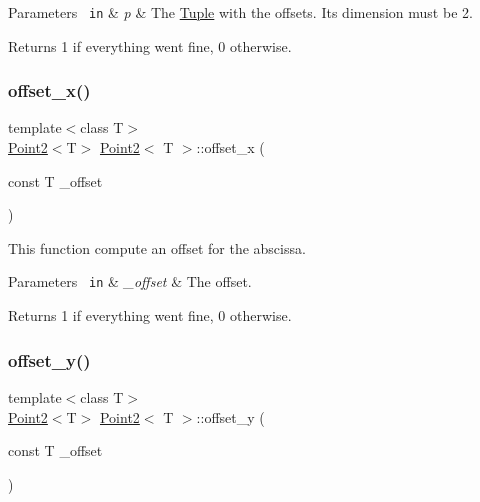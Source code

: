\begin{DoxyParams}[1]{Parameters}
\mbox{\texttt{ in}}  & {\em p} & The {\ttfamily \mbox{\hyperlink{class_tuple}{Tuple}}} with the offsets. Its dimension must be 2. \\
\hline
\end{DoxyParams}
\begin{DoxyReturn}{Returns}
1 if everything went fine, 0 otherwise. 
\end{DoxyReturn}
\mbox{\label{class_point2_ae1536c8c7960ddfdf2087a9e12ddfcf9}} 
\subsubsection{\texorpdfstring{offset\_x()}{offset\_x()}}
{\footnotesize\ttfamily template$<$class T$>$ \\
\mbox{\hyperlink{class_point2}{Point2}}$<$T$>$ \mbox{\hyperlink{class_point2}{Point2}}$<$ T $>$\+::offset\+\_\+x (\begin{DoxyParamCaption}\item[{const T}]{\+\_\+offset }\end{DoxyParamCaption})\hspace{0.3cm}{\ttfamily [inline]}}



This function compute an offset for the abscissa. 


\begin{DoxyParams}[1]{Parameters}
\mbox{\texttt{ in}}  & {\em \+\_\+offset} & The offset. \\
\hline
\end{DoxyParams}
\begin{DoxyReturn}{Returns}
1 if everything went fine, 0 otherwise. 
\end{DoxyReturn}
\mbox{\label{class_point2_abfbc8c5842e9876f7b89d18575fe138d}} 
\subsubsection{\texorpdfstring{offset\_y()}{offset\_y()}}
{\footnotesize\ttfamily template$<$class T$>$ \\
\mbox{\hyperlink{class_point2}{Point2}}$<$T$>$ \mbox{\hyperlink{class_point2}{Point2}}$<$ T $>$\+::offset\+\_\+y (\begin{DoxyParamCaption}\item[{const T}]{\+\_\+offset }\end{DoxyParamCaption})\hspace{0.3cm}{\ttfamily [inline]}}




